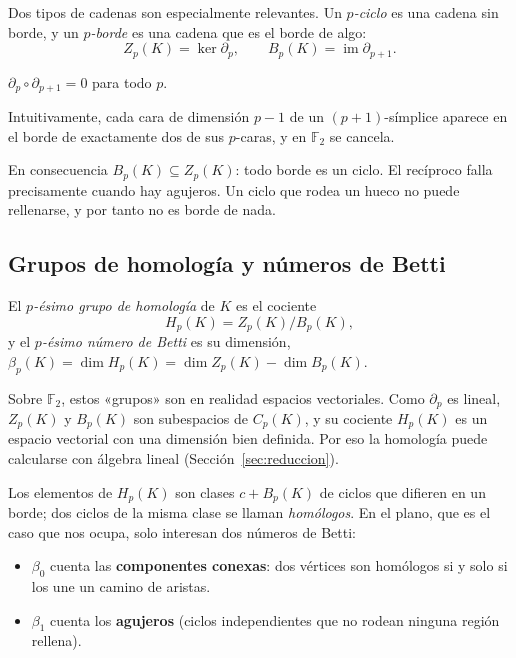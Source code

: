 Dos tipos de cadenas son especialmente relevantes. Un \emph{$p$-ciclo} es
una cadena sin borde, y un \emph{$p$-borde} es una cadena que es el borde de
algo:
\[
  Z_p(K)=\ker\partial_p,\qquad B_p(K)=\operatorname{im}\partial_{p+1}.
\]

\begin{lema}
$\partial_p\circ\partial_{p+1}=0$ para todo $p$.
\end{lema}

Intuitivamente, cada cara de dimensión $p-1$ de un $(p+1)$-símplice
aparece en el borde de exactamente dos de sus $p$-caras, y en
$\mathbb{F}_2$ se cancela.

En consecuencia $B_p(K)\subseteq Z_p(K)$: todo borde es un ciclo. El
recíproco falla precisamente cuando hay agujeros. Un ciclo que rodea un
hueco no puede rellenarse, y por tanto no es borde de nada.

\subsection{Grupos de homología y números de Betti}

\begin{definicion}
El \emph{$p$-ésimo grupo de homología} de $K$ es el cociente
\[
  H_p(K)=Z_p(K)/B_p(K),
\]
y el \emph{$p$-ésimo número de Betti} es su dimensión,
$\beta_p(K)=\dim H_p(K)=\dim Z_p(K)-\dim B_p(K)$.
\end{definicion}

\begin{observacion}
Sobre $\mathbb{F}_2$, estos «grupos» son en realidad espacios vectoriales.
Como $\partial_p$ es lineal, $Z_p(K)$ y $B_p(K)$ son subespacios de
$C_p(K)$, y su cociente $H_p(K)$ es un espacio vectorial con una dimensión
bien definida. Por eso la homología puede calcularse con álgebra lineal
(Sección~\ref{sec:reduccion}).
\end{observacion}

Los elementos de $H_p(K)$ son clases $c+B_p(K)$ de ciclos que difieren en un
borde; dos ciclos de la misma clase se llaman \emph{homólogos}. En el plano,
que es el caso que nos ocupa, solo interesan dos números de Betti:
\begin{itemize}
  \item $\beta_0$ cuenta las \textbf{componentes conexas}: dos vértices
  son homólogos si y solo si los une un camino de aristas.
  \item $\beta_1$ cuenta los \textbf{agujeros} (ciclos independientes que
  no rodean ninguna región rellena).
\end{itemize}

